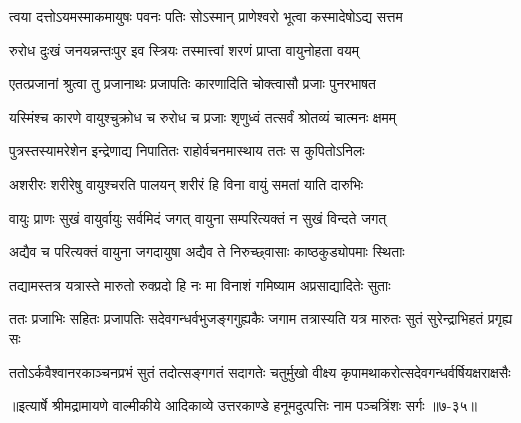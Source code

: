 \twolineshloka
{त्वया दत्तोऽयमस्माकमायुषः पवनः पतिः}
{सोऽस्मान् प्राणेश्वरो भूत्वा कस्मादेषोऽद्य सत्तम} %

\twolineshloka
{रुरोध दुःखं जनयन्नन्तःपुर इव स्त्रियः}
{तस्मात्त्वां शरणं प्राप्ता वायुनोहता वयम्} %

\twolineshloka
{एतत्प्रजानां श्रुत्वा तु प्रजानाथः प्रजापतिः}
{कारणादिति चोक्त्वासौ प्रजाः पुनरभाषत} %

\twolineshloka
{यस्मिंश्च कारणे वायुश्चुक्रोध च रुरोध च}
{प्रजाः शृणुध्वं तत्सर्वं श्रोतव्यं चात्मनः क्षमम्} %

\twolineshloka
{पुत्रस्तस्यामरेशेन इन्द्रेणाद्य निपातितः}
{राहोर्वचनमास्थाय ततः स कुपितोऽनिलः} %

\twolineshloka
{अशरीरः शरीरेषु वायुश्चरति पालयन्}
{शरीरं हि विना वायुं समतां याति दारुभिः} %

\twolineshloka
{वायुः प्राणः सुखं वायुर्वायुः सर्वमिदं जगत्}
{वायुना सम्परित्यक्तं न सुखं विन्दते जगत्} %

\twolineshloka
{अद्यैव च परित्यक्तं वायुना जगदायुषा}
{अद्यैव ते निरुच्छ्वासाः काष्ठकुड्योपमाः स्थिताः} %

\twolineshloka
{तद्यामस्तत्र यत्रास्ते मारुतो रुक्प्रदो हि नः}
{मा विनाशं गमिष्याम अप्रसाद्यादितेः सुताः} %

\twolineshloka
{ततः प्रजाभिः सहितः प्रजापतिः सदेवगन्धर्वभुजङ्गगुह्यकैः}
{जगाम तत्रास्यति यत्र मारुतः सुतं सुरेन्द्राभिहतं प्रगृह्य सः} %

\twolineshloka
{ततोऽर्कवैश्वानरकाञ्चनप्रभं सुतं तदोत्सङ्गगतं सदागतेः}
{चतुर्मुखो वीक्ष्य कृपामथाकरोत्सदेवगन्धर्वर्षियक्षराक्षसैः} %


॥इत्यार्षे श्रीमद्रामायणे वाल्मीकीये आदिकाव्ये उत्तरकाण्डे हनूमदुत्पत्तिः नाम पञ्चत्रिंशः सर्गः ॥७-३५॥

